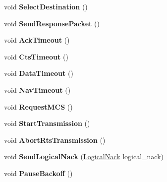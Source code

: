 \begin{DoxyCompactItemize}
\mbox{\label{classcompcxx__Node__23_a6e0f6db0d765f141adaf2eaf226a513e}} 
void {\bfseries Select\+Destination} ()
\item 
\mbox{\label{classcompcxx__Node__23_a1dee89b6eb5a511d15f842d41f09a8d2}} 
void {\bfseries Send\+Response\+Packet} ()
\item 
\mbox{\label{classcompcxx__Node__23_a34bf60a62ce77350e9efac3516a766ca}} 
void {\bfseries Ack\+Timeout} ()
\item 
\mbox{\label{classcompcxx__Node__23_a84999e7da3b655131d257d204cb5502f}} 
void {\bfseries Cts\+Timeout} ()
\item 
\mbox{\label{classcompcxx__Node__23_a90dfca805d82191d7e9d7017c289c46f}} 
void {\bfseries Data\+Timeout} ()
\item 
\mbox{\label{classcompcxx__Node__23_a35905e848f7592b9d2dfe98349b43bc0}} 
void {\bfseries Nav\+Timeout} ()
\item 
\mbox{\label{classcompcxx__Node__23_aaff7be853e3904fff1211d5dab6bb1b0}} 
void {\bfseries Request\+M\+CS} ()
\item 
\mbox{\label{classcompcxx__Node__23_a30702ef96e7643cc943fbbf01ac4b8d0}} 
void {\bfseries Start\+Transmission} ()
\item 
\mbox{\label{classcompcxx__Node__23_a1707011836a1260ed7f266b1c54a7e14}} 
void {\bfseries Abort\+Rts\+Transmission} ()
\item 
\mbox{\label{classcompcxx__Node__23_a1a57d975d6410b420bff7ddb91eee90e}} 
void {\bfseries Send\+Logical\+Nack} (\hyperlink{structLogicalNack}{Logical\+Nack} logical\+\_\+nack)
\item 
\mbox{\label{classcompcxx__Node__23_a0e502bf77e44dff1f8c6d4c6f993269c}} 
void {\bfseries Pause\+Backoff} ()
\item 
\mbox{\label{classcompcxx__Node__23_a3be4fc1f2166caa881683495a2527068}} 

\end{DoxyCompactItemize}
